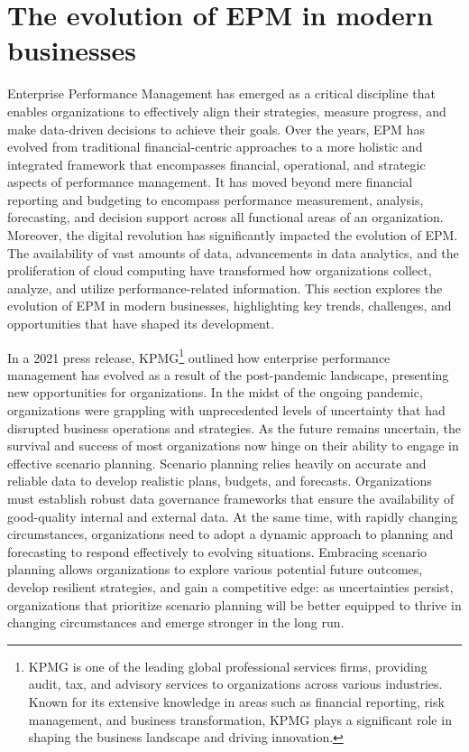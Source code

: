 \documentclass[12pt,a4paper,openright,twoside]{book}
\begin{document}
\section{The evolution of EPM in modern businesses}

Enterprise Performance Management has emerged as a critical discipline that enables organizations to effectively align their strategies, measure progress, and make data-driven decisions to achieve their goals. 
%
Over the years, EPM has evolved from traditional financial-centric approaches to a more holistic and integrated framework that encompasses financial, operational, and strategic aspects of performance management. 
%
It has moved beyond mere financial reporting and budgeting to encompass performance measurement, analysis, forecasting, and decision support across all functional areas of an organization.
%
Moreover, the digital revolution has significantly impacted the evolution of EPM. 
%
The availability of vast amounts of data, advancements in data analytics, and the proliferation of cloud computing have transformed how organizations collect, analyze, and utilize performance-related information.
%
This section explores the evolution of EPM in modern businesses, highlighting key trends, challenges, and opportunities that have shaped its development.

In a 2021 press release, KPMG\footnote{KPMG is one of the leading global professional services firms, providing audit, tax, and advisory services to organizations across various industries. Known for its extensive knowledge in areas such as financial reporting, risk management, and business transformation, KPMG plays a significant role in shaping the business landscape and driving innovation.} outlined how enterprise performance management has evolved as a result of the post-pandemic landscape, presenting new opportunities for organizations\cite{kpmg2021evolution}.
%
In the midst of the ongoing pandemic, organizations were grappling with unprecedented levels of uncertainty that had disrupted business operations and strategies. 
%
As the future remains uncertain, the survival and success of most organizations now hinge on their ability to engage in effective scenario planning.
%
Scenario planning relies heavily on accurate and reliable data to develop realistic plans, budgets, and forecasts. 
%
Organizations must establish robust data governance frameworks that ensure the availability of good-quality internal and external data. 
%
At the same time, with rapidly changing circumstances, organizations need to adopt a dynamic approach to planning and forecasting to respond effectively to evolving situations. 
%
Embracing scenario planning allows organizations to explore various potential future outcomes, develop resilient strategies, and gain a competitive edge: as uncertainties persist, organizations that prioritize scenario planning will be better equipped to thrive in changing circumstances and emerge stronger in the long run.
\end{document}
